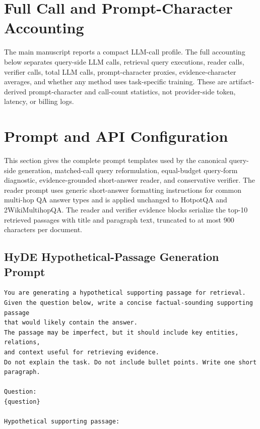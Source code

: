 \documentclass[10pt]{article}
\begin{document}
\clearpage
\section{Full Call and Prompt-Character Accounting}
\label{sec:supp_full_accounting}

The main manuscript reports a compact LLM-call profile. The full accounting below separates query-side LLM calls, retrieval query executions, reader calls, verifier calls, total LLM calls, prompt-character proxies, evidence-character averages, and whether any method uses task-specific training. These are artifact-derived prompt-character and call-count statistics, not provider-side token, latency, or billing logs.





\clearpage
\section{Prompt and API Configuration}
\label{sec:supp_prompt_api}

This section gives the complete prompt templates used by the canonical query-side generation, matched-call query reformulation, equal-budget query-form diagnostic, evidence-grounded short-answer reader, and conservative verifier. The reader prompt uses generic short-answer formatting instructions for common multi-hop QA answer types and is applied unchanged to HotpotQA and 2WikiMultihopQA. The reader and verifier evidence blocks serialize the top-10 retrieved passages with title and paragraph text, truncated to at most 900 characters per document.

\subsection{HyDE Hypothetical-Passage Generation Prompt}
\begingroup\footnotesize
\begin{verbatim}
You are generating a hypothetical supporting passage for retrieval.
Given the question below, write a concise factual-sounding supporting passage
that would likely contain the answer.
The passage may be imperfect, but it should include key entities, relations,
and context useful for retrieving evidence.
Do not explain the task. Do not include bullet points. Write one short paragraph.

Question:
{question}

Hypothetical supporting passage:
\end{verbatim}
\endgroup
\end{document}
